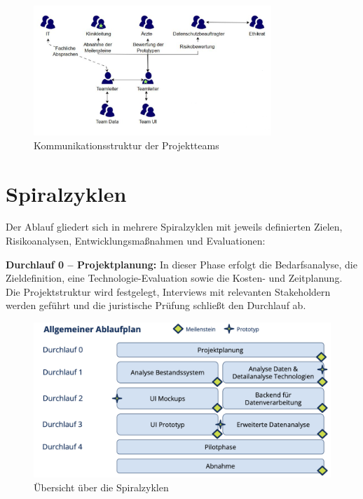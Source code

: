 \begin{figure}[ht]
  \centering
  \includegraphics[width=0.8\textwidth]{fig/kommunikation.png}
  \caption{Kommunikationsstruktur der Projektteams}
\end{figure}

\section{Spiralzyklen}
Der Ablauf gliedert sich in mehrere Spiralzyklen mit jeweils definierten Zielen, Risikoanalysen, Entwicklungsmaßnahmen und Evaluationen:

\textbf{Durchlauf 0 – Projektplanung:} In dieser Phase erfolgt die Bedarfsanalyse, die Zieldefinition, eine Technologie-Evaluation sowie die Kosten- und Zeitplanung. Die Projektstruktur wird festgelegt, Interviews mit relevanten Stakeholdern werden geführt und die juristische Prüfung schließt den Durchlauf ab.

\begin{figure}[ht]
  \centering
  \includegraphics[width=\textwidth]{fig/ablaufplan.png}
  \caption{Übersicht über die Spiralzyklen}
\end{figure}

